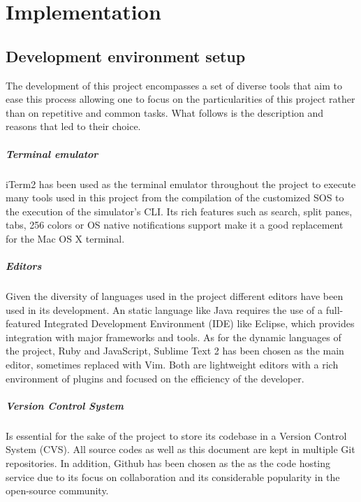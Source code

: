 \chapter{Implementation}

\section{Development environment setup}

The development of this project encompasses a set of diverse tools that aim to ease this process allowing one to focus on the particularities of this project rather than on repetitive and common tasks. What follows is the description and reasons that led to their choice.

\paragraph{Terminal emulator} iTerm2 has been used as the terminal emulator throughout the project to execute many tools used in this project from the compilation of the customized SOS to the execution of the simulator's CLI. Its rich features such as search, split panes, tabs, 256 colors or OS native notifications support make it a good replacement for the Mac OS X terminal.

\paragraph{Editors} Given the diversity of languages used in the project different editors have been used in its development. An static language like Java requires the use of a full-featured Integrated Development Environment (IDE) like Eclipse, which provides integration with major frameworks and tools. As for the dynamic languages of the project, Ruby and JavaScript, Sublime Text 2 has been chosen as the main editor, sometimes replaced with Vim. Both are lightweight editors with a rich environment of plugins and focused on the efficiency of the developer.

\paragraph{Version Control System} Is essential for the sake of the project to store its codebase in a Version Control System (CVS). All source codes as well as this document are kept in multiple Git repositories. In addition, Github has been chosen as the as the code hosting service due to its focus on collaboration and its considerable popularity in the open-source community.
	
